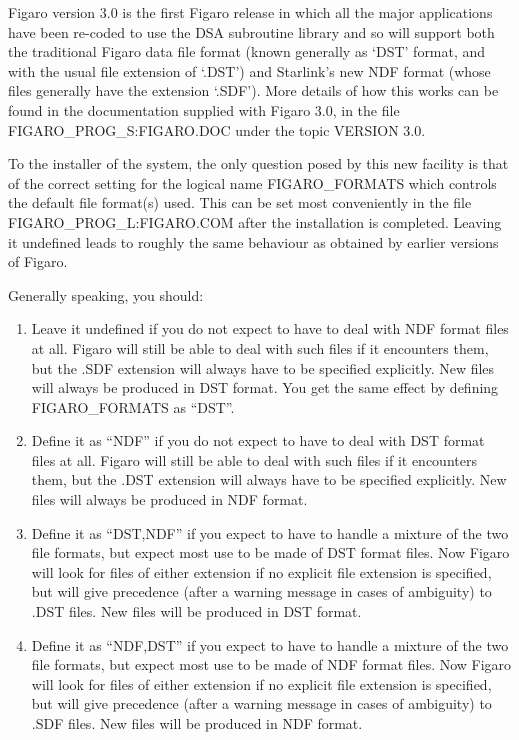 Figaro version 3.0 is the first Figaro release in which all the major
applications have been re-coded to use the DSA subroutine library and so will
support both the traditional Figaro data file format (known generally as `DST'
format, and with the usual file extension of `.DST') and Starlink's new NDF
format (whose files generally have the extension `.SDF'). More details of how
this works can be found in the documentation supplied with Figaro 3.0, in 
the file FIGARO\_PROG\_S:FIGARO.DOC under the topic VERSION 3.0.

To the installer of the system, the only question posed by this new facility is
that of the correct setting for the logical name FIGARO\_FORMATS which controls
the default file format(s) used. This can be set most conveniently in the file
FIGARO\_PROG\_L:FIGARO.COM after the installation is completed. Leaving it
undefined leads to roughly the same behaviour as obtained by earlier versions
of Figaro.

Generally speaking, you should:

\begin{enumerate}

\item Leave it undefined if you do not expect to have to deal with NDF format 
files at all. Figaro will still be able to deal with such files if it
encounters them, but the .SDF extension will always have to be specified
explicitly. New files will always be produced in DST format. You get the same
effect by defining FIGARO\_FORMATS as ``DST''.

\item Define it as ``NDF'' if you do not expect to have to deal with DST 
format files at all. Figaro will still be able to deal with such files if it
encounters them, but the .DST extension will always have to be specified
explicitly. New files will always be produced in NDF format.

\item Define it as ``DST,NDF'' if you expect to have to handle a mixture of 
the two file formats, but expect most use to be made of DST format files. Now
Figaro will look for files of either extension if no explicit file extension
is specified, but will give precedence (after a warning message in cases of
ambiguity) to .DST files. New files will be produced in DST format.

\item Define it as ``NDF,DST'' if you expect to have to handle a mixture of 
the two file formats, but expect most use to be made of NDF format files. Now
Figaro will look for files of either extension if no explicit file extension
is specified, but will give precedence (after a warning message in cases of
ambiguity) to .SDF files. New files will be produced in NDF format.

\end{enumerate}

